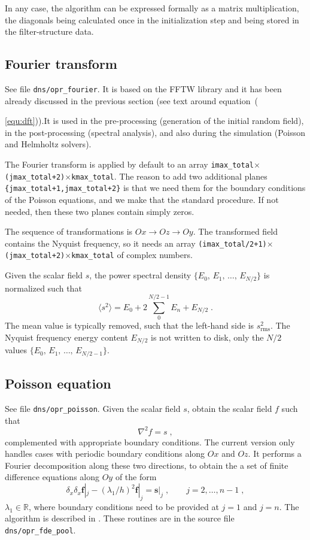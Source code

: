 In any case, the algorithm can be expressed formally as a matrix multiplication, the diagonals being calculated once in the initialization step and being stored in the filter-structure data.

\subsection{Fourier transform}

See file {\tt dns/opr\_fourier}. It is based on the FFTW library and it has been already discussed in the previous section (see text around equation~({\ref{equ:dft})).It is used in the pre-processing (generation of the   initial random field), in the post-processing (spectral analysis), and also during the simulation (Poisson and Helmholtz solvers).

The Fourier transform is applied by default to an array {\tt imax\_total}$\times${\tt(jmax\_total+2)}$\times${\tt kmax\_total}. The reason to add two additional planes {\tt \{jmax\_total+1,jmax\_total+2\}} is that we need them for the boundary conditions of the Poisson equations, and we make that the standard procedure. If not needed, then these two planes contain simply zeros.

The sequence of transformations is $Ox\rightarrow Oz\rightarrow Oy$. The transformed field contains the Nyquist frequency, so it needs an array {\tt(imax\_total/2+1)}$\times${\tt(jmax\_total+2)}$\times${\tt kmax\_total} of complex numbers.

Given the scalar field $s$, the power spectral density $\{E_0,\,E_1,\,\ldots,\,E_{N/2}\}$ is normalized such that
\begin{equation}
\langle s^2\rangle = E_0+2\sum_0^{N/2-1}E_n+E_{N/2} \;.
\end{equation}
The mean value is typically removed, such that the left-hand side is $s^2_\text{rms}$. The Nyquist frequency energy content $E_{N/2}$ is not written to disk, only the $N/2$ values $\{E_0,\,E_1,\,\ldots,\,E_{N/2-1}\}$.

\subsection{Poisson equation}

See file {\tt dns/opr\_poisson}. Given the scalar field $s$, obtain the scalar field $f$ such that
\begin{equation}
  \nabla^2 f= s \;,
\end{equation}
complemented with appropriate boundary conditions.  The current version only handles cases with periodic boundary conditions along $Ox$ and $Oz$. It performs a Fourier decomposition along these two directions, to obtain the a set of finite difference equations along $Oy$ of the form
\begin{equation}
  \delta_x \delta_x \mathbf{f}|_j - (\lambda_1/h)^2\mathbf{f}|_j=\mathbf{s}|_j 
  \;,\qquad j=2,\ldots,n-1 \;,
\end{equation}
$\lambda_1\in\mathbb{R}$, where boundary conditions need to be provided at $j=1$ and $j=n$.  The algorithm is described in \cite{Mellado:2012}. These routines are in the source file {\tt dns/opr\_fde\_pool}.

}
